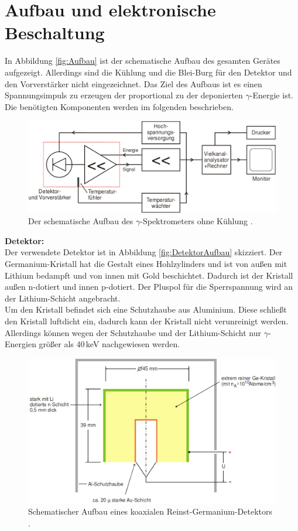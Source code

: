 \section{Aufbau und elektronische Beschaltung}
In Abbildung \eqref{fig:Aufbau} ist der schematische Aufbau des gesamten Gerätes aufgezeigt. Allerdings sind die Kühlung und die Blei-Burg für den Detektor und den Vorverstärker nicht eingezeichnet. Das Ziel des Aufbaus ist es einen Spannungsimpuls zu erzeugen der proportional zu der deponierten $\gamma$-Energie ist. Die benötigten Komponenten werden im folgenden beschrieben.

\begin{figure}[H]
  \centering
  \includegraphics[width=\linewidth]{Bilder/Aufbau.png}
  \caption{Der schematische Aufbau des $\gamma$-Spektrometers ohne Kühlung \cite{V18}.}
  \label{fig:Aufbau}
\end{figure}

\textbf{Detektor:} \\
Der verwendete Detektor ist in Abbildung \eqref{fig:DetektorAufbau} skizziert. Der Germanium-Kristall hat die Gestalt eines Hohlzylinders und ist von außen mit Lithium bedampft und von innen mit Gold beschichtet. Dadurch ist der Kristall außen n-dotiert und innen p-dotiert. Der Pluspol für die Sperrspannung wird an der Lithium-Schicht angebracht. \\
Um den Kristall befindet sich eine Schutzhaube aus Aluminium. Diese schließt den Kristall luftdicht ein, dadurch kann der Kristall nicht verunreinigt werden. Allerdings können wegen der Schutzhaube und der Lithium-Schicht nur $\gamma$-Energien größer als 40\,keV nachgewiesen werden.
\begin{figure}[H]
  \centering
  \includegraphics[width=0.9\linewidth]{Bilder/Germanium-Detektor.png}
  \caption{Schematischer Aufbau eines koaxialen Reinst-Germanium-Detektors \cite{V18}.}
  \label{fig:DetektorAufbau}
\end{figure}

